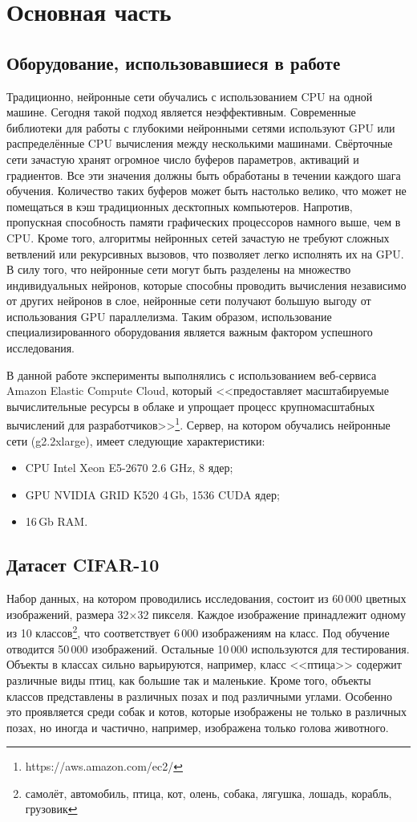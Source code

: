 \section{Основная часть}
\subsection{Оборудование, использовавшиеся в работе}
Традиционно, нейронные сети обучались с использованием CPU на одной машине. Сегодня такой подход
является неэффективным. Современные библиотеки для работы с глубокими нейронными сетями
используют GPU или распределённые CPU вычисления между несколькими машинами.
Свёрточные сети зачастую хранят огромное число буферов параметров, активаций и градиентов.
Все эти значения должны быть обработаны в течении каждого шага обучения. Количество таких буферов
может быть настолько велико, что может не помещаться в кэш традиционных десктопных компьютеров.
Напротив, пропускная способность памяти графических процессоров намного выше, чем в CPU.
Кроме того, алгоритмы нейронных сетей зачастую не требуют сложных ветвлений или рекурсивных вызовов,
что позволяет легко исполнять их на GPU. В силу того, что нейронные сети могут быть разделены на множество
индивидуальных нейронов, которые способны проводить вычисления независимо от других нейронов в слое,
нейронные сети получают большую выгоду от использования GPU параллелизма. Таким образом, использование
специализированного оборудования является важным фактором успешного исследования.

В данной работе эксперименты выполнялись с использованием веб-сервиса Amazon Elastic Compute Cloud, который
<<предоставляет масштабируемые вычислительные ресурсы в облаке и упрощает процесс крупномасштабных вычислений
для разработчиков>>\footnote{https://aws.amazon.com/ec2/}. Сервер, на котором обучались нейронные сети (g2.2xlarge),
имеет следующие характеристики:
\begin{itemize}
    \item CPU Intel Xeon E5-2670 2.6 GHz, 8 ядер;
    \item GPU NVIDIA GRID K520 4\,Gb, 1536 CUDA ядер;
    \item 16\,Gb RAM.
\end{itemize}

\subsection{Датасет CIFAR-10}
Набор данных, на котором проводились исследования, состоит из 60\,000 цветных изображений, размера 
32$\times$32 пикселя. Каждое изображение принадлежит одному из 10 классов\footnote{самолёт, автомобиль, птица,
кот, олень, собака, лягушка, лошадь, корабль, грузовик}, что соответствует 6\,000 изображениям на класс. Под 
обучение отводится 50\,000 изображений. Остальные 10\,000 используются для тестирования. Объекты в классах сильно варьируются, 
например, класс <<птица>> содержит различные виды птиц, как большие так и маленькие. Кроме того, объекты классов представлены в 
различных позах и под различными углами. Особенно это проявляется среди собак и котов, которые изображены не только в различных 
позах, но иногда и частично, например, изображена только голова животного.

